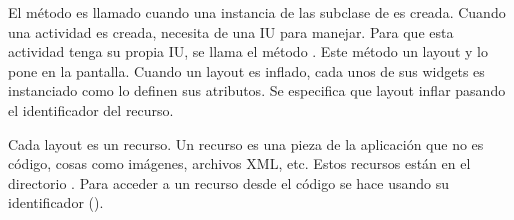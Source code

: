 \begin{sphinxVerbatim}[commandchars=\\\{\}]
        
              
                
        
              
                
\end{sphinxVerbatim}

El método  es llamado cuando una instancia de las subclase
de  es creada. Cuando una actividad es creada, necesita de una IU para
manejar. Para que esta actividad tenga su propia IU, se llama el método
. Este método  un layout y lo pone en la pantalla.
Cuando un layout es inflado, cada unos de sus widgets es instanciado como
lo definen sus atributos. Se especifica que layout inflar pasando el identificador
del recurso.

Cada layout es un recurso. Un recurso es una pieza de la aplicación que no es
código, cosas como imágenes, archivos XML, etc. Estos recursos están en
el directorio . Para acceder a un recurso desde el código se hace
usando su identificador ().

